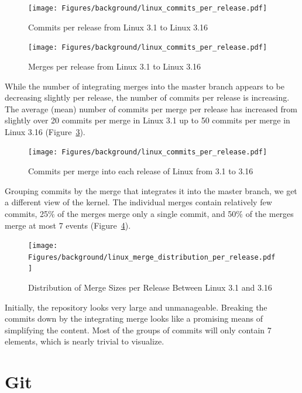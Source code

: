 \begin{figure}[htpb]
  \centering
  \texttt{[image: Figures/background/linux\_commits\_per\_release.pdf]}
  \caption{Commits per release from Linux 3.1 to Linux 3.16}
  \label{fig:linux_commits_per_release}
\end{figure}

\begin{figure}[htpb]
  \centering
  \texttt{[image: Figures/background/linux\_commits\_per\_release.pdf]}
  \caption{Merges per release from Linux 3.1 to Linux 3.16}
  \label{fig:linux_merges_per_release}
\end{figure}

While the number of integrating merges into the master branch appears to
be decreasing slightly per release, the number of commits per release is
increasing. The average (mean) number of commits per merge per release
has increased from slightly over 20 commits per merge in Linux 3.1 up to
50 commits per merge in Linux 3.16
(Figure~\ref{fig:linux_commits_per_merge_per_release}).

\begin{figure}[htpb]
  \centering
  \texttt{[image: Figures/background/linux\_commits\_per\_release.pdf]}
  \caption{Commits per merge into each release of Linux from 3.1 to 3.16
    }
  \label{fig:linux_commits_per_merge_per_release}
\end{figure}

Grouping commits by the merge that integrates it into the master branch,
we get a different view of the kernel. The individual merges contain
relatively few commits, 25\% of the merges merge only a single commit,
and 50\% of the merges merge at most 7 events
(Figure~\ref{fig:linux_merge_distribution_per_release}).

\begin{figure}[htpb]
  \centering
  \texttt{[image: Figures/background/linux\_merge\_distribution\_per\_release.pdf]}
  \caption{Distribution of Merge Sizes per Release Between Linux 3.1 and
  3.16}
  \label{fig:linux_merge_distribution_per_release}
\end{figure}

Initially, the repository looks very large and unmanageable. Breaking
the commits down by the integrating merge looks like a promising means
of simplifying the content. Most of the groups of commits will only
contain 7 elements, which is nearly trivial to visualize.

\section{Git}\label{sec:git}

